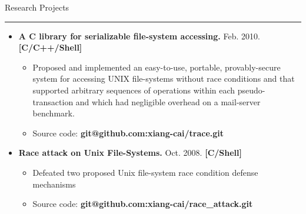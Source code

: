\documentclass[11pt,oneside]{article}
\newenvironment{ressection}[1]{
	{\fontfamily{phv}\selectfont\Large#1}
	
	\vspace{-8pt} \rule{\textwidth}{.5pt}
	
	\vspace{-4pt}
	\begin{itemize}
	\vspace{.5pt}
}{
	\end{itemize}
}
\newcommand{\resitem}[1]{
	\vspace{2pt}
	\item \begin{flushleft} #1 \end{flushleft}
}
\begin{document}
\begin{ressection}{Research Projects}
	\vspace{-4pt}
	\resitem{\textbf{A C library for serializable file-system
				accessing.} Feb. 2010. \hfill\textbf{[C/C++/Shell]} 
		\vspace{-2pt}
		\begin{small}
		\begin{itemize}
		\item
		Proposed and implemented an
					easy-to-use, portable, provably-secure system for
					accessing UNIX file-systems without race conditions
					and that supported arbitrary sequences of operations
					within each pseudo-transaction and which had
					negligible overhead on a mail-server
					benchmark.
		\item					
		Source code: \textbf{git@github.com:xiang-cai/trace.git}
		\end{itemize}		
		\end{small}
	}
	
	\vspace{-4pt}
	\resitem{\textbf{Race attack on Unix File-Systems.} Oct. 2008. \hfill\textbf{[C/Shell]}
		\vspace{-2pt}
		\begin{small}

		\begin{itemize}
		\item		
		Defeated two proposed Unix file-system race
			condition defense mechanisms
		\item			
		Source code: \textbf{git@github.com:xiang-cai/race\_attack.git}
		\end{itemize}		
		\end{small}
	} 



\end{ressection}
\end{document}
